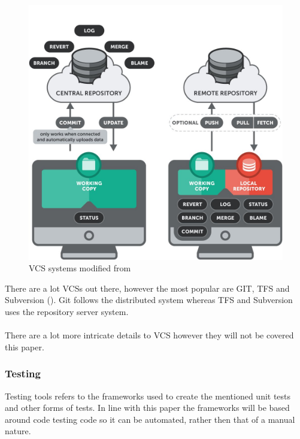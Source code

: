 \begin{figure}[H]
	\centering
	\includegraphics[scale=0.30]{images/systems.jpg}
	\caption{VCS systems modified from \cite{VCSSYSTEMS}}
	\label{fig:vcs_systems}
\end{figure}

There are a lot VCSs out there, however the most popular are GIT, TFS and Subversion (\cite{vcspop}). Git follows the distributed system whereas TFS and Subversion uses the repository server system.
\\\\
There are a lot more intricate details to VCS however they will not be covered this paper.

\subsubsection{Testing}

Testing tools refers to the frameworks used to create the mentioned unit tests and other forms of tests. In line with this paper the frameworks will be based around code testing code so it can be automated, rather then that of a manual nature.

